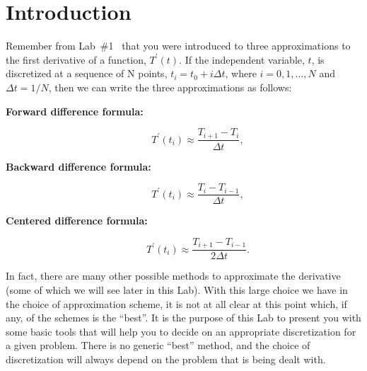 % 
%
%
%
%
%
%
%

\section{Introduction}
\label{lab2:sec:intro}

Remember from Lab~\#1~ that you
were introduced to three approximations to the first derivative of a
function, $T^\prime(t)$.  If the independent variable, $t$, is
discretized at a sequence of N points, $t_i=t_0+i \Delta t$, where $i
= 0,1,\ldots, N$ and $\Delta t= 1/N$, then we can write the three
approximations as follows:
\begin{description}
\item[\textbf{ Forward difference formula:}] 
  \begin{equation}
    T^\prime(t_i) \approx \frac{T_{i+1}-T_i}{\Delta t},
    \label{lab2:eq:forward-diff}
  \end{equation}
\item[\textbf{ Backward difference formula:}]
  \begin{equation}
    T^\prime(t_i) \approx \frac{T_{i}-T_{i-1}}{\Delta t},
    \label{lab2:eq:backward-diff}
  \end{equation}
\item[\textbf{ Centered difference formula:}]
  \begin{equation}
    T^\prime(t_i) \approx \frac{T_{i+1}-T_{i-1}}{2 \Delta t}.
    \label{lab2:eq:centered-diff}
  \end{equation}
\end{description}
In fact, there are many other possible methods to approximate the
derivative (some of which we will see later in this Lab).
With this large choice we have in the choice of approximation scheme,
it is not at all clear at this point which, if any, of the schemes 
is the ``best''.
It is the purpose of this Lab to present you with some basic tools
that will help you to decide on an appropriate discretization for a
given problem.
There is no generic ``best'' method, and the choice of discretization
will always depend on the problem that is being dealt with.

